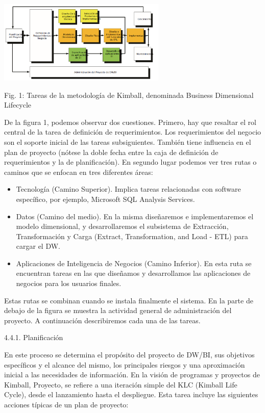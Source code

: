 \documentclass[%
 reprint,
 amsmath,amssymb,
 aps,
]{revtex4-1}
\begin{document}
				\begin{center}
					\includegraphics[width=8cm]{./IMAGENES/img01}
				\end{center}
				
Fig. 1: Tareas de la metodología de Kimball, denominada Business Dimensional Lifecycle 

De la figura 1, podemos observar dos cuestiones. Primero, hay que resaltar el rol central de la tarea de definición de requerimientos. Los requerimientos del negocio son el soporte inicial de las tareas subsiguientes. También tiene influencia en el plan de proyecto (nótese la doble fecha entre la caja de definición de requerimientos y la de planificación). En segundo lugar podemos ver tres rutas o caminos que se enfocan en tres diferentes áreas:

\begin{itemize}
	\item Tecnología (Camino Superior). Implica tareas relacionadas con software específico, por ejemplo, Microsoft SQL Analysis Services.
	\item Datos (Camino del medio). En la misma diseñaremos e implementaremos el modelo dimensional, y desarrollaremos el subsistema de Extracción, Transformación y Carga (Extract, Transformation, and Load - ETL) para cargar el DW.
	\item Aplicaciones de Inteligencia de Negocios (Camino Inferior). En esta ruta se encuentran tareas en las que diseñamos y desarrollamos las aplicaciones de negocios para los usuarios finales.
\end{itemize}

Estas rutas se combinan cuando se instala finalmente el sistema.
En la parte de debajo de la figura se muestra la actividad general de administración del proyecto. A continuación describiremos cada una de las tareas.

4.4.1. Planificación

En este proceso se determina el propósito del proyecto de DW/BI, sus objetivos específicos y el alcance del mismo, los principales riesgos y una aproximación inicial a las necesidades de información.
En la visión de programas y proyectos de Kimball, Proyecto, se refiere a una iteración simple del KLC (Kimball Life Cycle), desde el lanzamiento hasta el despliegue.
Esta tarea incluye las siguientes acciones típicas de un plan de proyecto:
\end{document}
